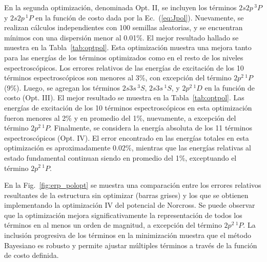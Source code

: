 En la segunda optimización, denominada Opt. II, se incluyen los términos 
$2s2p\,^3P$ y $2s2p\,^1P$ en la función de costo dada por la 
Ec.~(\ref{eq:Jpol}). Nuevamente, se realizan cálculos independientes con 
100 semillas aleatorias, y se encuentran mínimos con una dispersión 
menor al 0.01\%. El mejor resultado hallado se muestra en la 
Tabla~\ref{tab:optpol}. Esta optimización muestra una mejora tanto para 
las energías de los términos optimizados como en el resto de 
los niveles espectroscópicos. Los errores relativos de las energías de 
excitación de los 10 términos espectroscópicos son menores al 3\%, con 
excepción del término $2p^2\,^1P$ (9\%). 
Luego, se agregan los términos $2s3s\,^3S$, $2s3s\,^1S$, y $2p^2\,^1D$ 
en la función de costo (Opt. III). El mejor resultado se muestra en 
la Tabla~\ref{tab:optpol}. Las energías de excitación de los 10 términos 
espectroscópicos en esta optimización fueron menores al 2\% y en 
promedio del 1\%, nuevamente, a excepción del término $2p^2\,^1P$. 
Finalmente, se considera la energía absoluta de los 11 términos 
espectroscópicos (Opt. IV). El error encontrado en las energías totales
en esta optimización es aproximadamente $0.02\%$, mientras que las 
energías relativas al estado fundamental continuan siendo en promedio 
del 1\%, exceptuando el término $2p^2\,^1P$. 

En la Fig.~\ref{fig:erp_polopt} se muestra una comparación entre los 
errores relativos resultantes de la estructura sin optimizar (barras 
grises) y los que se obtienen implementando la optimización IV del 
potencial de Norcross. Se puede observar que la optimización mejora 
significativamente la representación de todos los términos en al menos
un orden de magnitud, a excepción del término $2p^2\,^1P$. La inclusión
progresiva de los términos en la minimización muestra que el método 
Bayesiano es robusto y permite ajustar múltiples términos a través de 
la función de costo definida.



